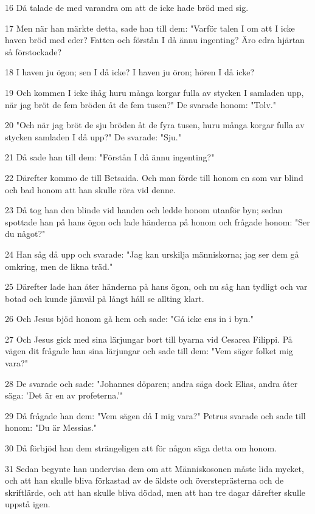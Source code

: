 \par 16 Då talade de med varandra om att de icke hade bröd med sig.
\par 17 Men när han märkte detta, sade han till dem: "Varför talen I om att I icke haven bröd med eder? Fatten och förstån I då ännu ingenting? Äro edra hjärtan så förstockade?
\par 18 I haven ju ögon; sen I då icke? I haven ju öron; hören I då icke?
\par 19 Och kommen I icke ihåg huru många korgar fulla av stycken I samladen upp, när jag bröt de fem bröden åt de fem tusen?" De svarade honom: "Tolv."
\par 20 "Och när jag bröt de sju bröden åt de fyra tusen, huru många korgar fulla av stycken samladen I då upp?" De svarade: "Sju."
\par 21 Då sade han till dem: "Förstån I då ännu ingenting?"
\par 22 Därefter kommo de till Betsaida. Och man förde till honom en som var blind och bad honom att han skulle röra vid denne.
\par 23 Då tog han den blinde vid handen och ledde honom utanför byn; sedan spottade han på hans ögon och lade händerna på honom och frågade honom: "Ser du något?"
\par 24 Han såg då upp och svarade: "Jag kan urskilja människorna; jag ser dem gå omkring, men de likna träd."
\par 25 Därefter lade han åter händerna på hans ögon, och nu såg han tydligt och var botad och kunde jämväl på långt håll se allting klart.
\par 26 Och Jesus bjöd honom gå hem och sade: "Gå icke ens in i byn."
\par 27 Och Jesus gick med sina lärjungar bort till byarna vid Cesarea Filippi. På vägen dit frågade han sina lärjungar och sade till dem: "Vem säger folket mig vara?"
\par 28 De svarade och sade: "Johannes döparen; andra säga dock Elias, andra åter säga: 'Det är en av profeterna.'"
\par 29 Då frågade han dem: "Vem sägen då I mig vara?" Petrus svarade och sade till honom: "Du är Messias."
\par 30 Då förbjöd han dem strängeligen att för någon säga detta om honom.
\par 31 Sedan begynte han undervisa dem om att Människosonen måste lida mycket, och att han skulle bliva förkastad av de äldste och översteprästerna och de skriftlärde, och att han skulle bliva dödad, men att han tre dagar därefter skulle uppstå igen.
